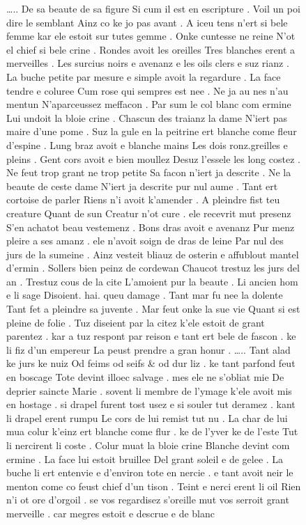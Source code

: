 \documentclass[
  letterpaper,
  DIV=11,
  numbers=noendperiod,
  oneside]{scrreprt}
\begin{document}
\begin{figure}
\ldots.. De sa beaute de sa figure Si cum il est en escripture . Voil un
poi dire le semblant Ainz co ke jo pas avant . A iceu tens n'ert si bele
femme kar ele estoit sur tutes gemme . Onke cuntesse ne reine N'ot el
chief si bele crine . Rondes avoit les oreilles Tres blanches erent a
merveilles . Les surcius noirs e avenanz e les oils clers e suz rianz .
La buche petite par mesure e simple avoit la regardure . La face tendre
e coluree Cum rose qui sempres est nee . Ne ja au nes n'au mentun
N'aparceussez meffacon . Par sum le col blanc com ermine Lui undoit la
bloie crine . Chascun des traianz la dame N'iert pas maire d'une pome .
Suz la gule en la peitrine ert blanche come fleur d'espine . Lung braz
avoit e blanche mains Les dois ronz.greilles e pleins . Gent cors avoit
e bien moullez Desuz l'essele les long costez . Ne feut trop grant ne
trop petite Sa facon n'iert ja descrite . Ne la beaute de ceste dame
N'iert ja descrite pur nul aume . Tant ert cortoise de parler Riens n'i
avoit k'amender . A pleindre fist teu creature Quant de sun Creatur n'ot
cure . ele recevrit mut presenz S'en achatot beau vestemenz . Bons dras
avoit e avenanz Pur menz pleire a ses amanz . ele n'avoit soign de dras
de leine Par nul des jurs de la sumeine . Ainz vesteit bliauz de osterin
e affublout mantel d'ermin . Sollers bien peinz de cordewan Chaucot
trestuz les jurs del an . Trestuz cous de la cite L'amoient pur la
beaute . Li ancien hom e li sage Disoient. hai. queu damage . Tant mar
fu nee la dolente Tant fet a pleindre sa juvente . Mar feut onke la sue
vie Quant si est pleine de folie . Tuz diseient par la citez k'ele
estoit de grant parentez . kar a tuz respont par reison e tant ert bele
de fascon . ke li fiz d'un empereur La peust prendre a gran honur .
\ldots.. Tant alad ke jurs ke nuiz Od feims od seifs \& od dur liz . ke
tant parfond feut en boscage Tote devint illoec salvage . mes ele ne
s'obliat mie De deprier saincte Marie . sovent li membre de l'ymage
k'ele avoit mis en hostage . si drapel furent tost usez e si souler tut
deramez . kant li drapel erent rumpu Le cors de lui remist tut nu . La
char de lui mua colur k'einz ert blanche come flur . ke de l'yver ke de
l'este Tut li nercirent li coste . Colur muat la bloie crine Blanche
devint com ermine . La face lui estoit bruillee Del grant soleil e de
gelee . La buche li ert entenvie e d'environ tote en nercie . e tant
avoit neir le menton come co feust chief d'un tison . Teint e nerci
erent li oil Rien n'i ot ore d'orgoil . se vos regardisez s'oreille mut
vos serroit grant merveille . car megres estoit e descrue e de blanc

\end{figure}
\end{document}
